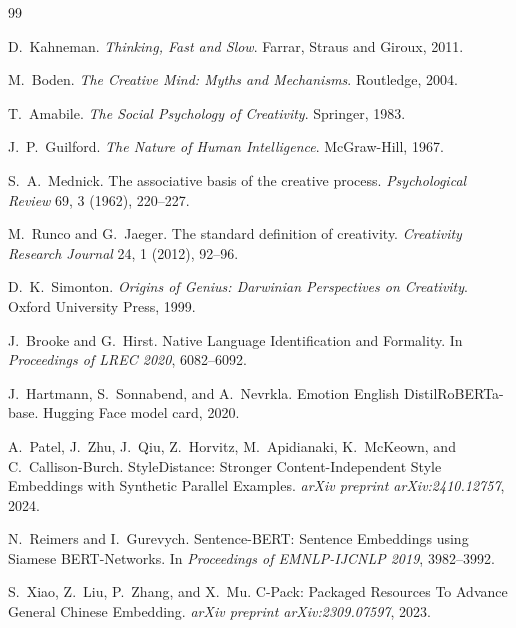 \documentclass[sigconf,nonacm]{acmart}
\begin{document}
\appendix


\begin{thebibliography}{99}

D.~Kahneman.
\newblock \textit{Thinking, Fast and Slow}.
\newblock Farrar, Straus and Giroux, 2011.

M.~Boden.
\newblock \textit{The Creative Mind: Myths and Mechanisms}.
\newblock Routledge, 2004.

T.~Amabile.
\newblock \textit{The Social Psychology of Creativity}.
\newblock Springer, 1983.

J.~P.~Guilford.
\newblock \textit{The Nature of Human Intelligence}.
\newblock McGraw-Hill, 1967.

S.~A.~Mednick.
\newblock The associative basis of the creative process.
\newblock \textit{Psychological Review} 69, 3 (1962), 220--227.

M.~Runco and G.~Jaeger.
\newblock The standard definition of creativity.
\newblock \textit{Creativity Research Journal} 24, 1 (2012), 92--96.

D.~K.~Simonton.
\newblock \textit{Origins of Genius: Darwinian Perspectives on Creativity}.
\newblock Oxford University Press, 1999.

J.~Brooke and G.~Hirst.
\newblock Native Language Identification and Formality.
\newblock In \textit{Proceedings of LREC 2020}, 6082--6092.

J.~Hartmann, S.~Sonnabend, and A.~Nevrkla.
\newblock Emotion English DistilRoBERTa-base.
\newblock Hugging Face model card, 2020.

A.~Patel, J.~Zhu, J.~Qiu, Z.~Horvitz, M.~Apidianaki, K.~McKeown, and C.~Callison-Burch.
\newblock StyleDistance: Stronger Content-Independent Style Embeddings with Synthetic Parallel Examples.
\newblock \textit{arXiv preprint arXiv:2410.12757}, 2024.

N.~Reimers and I.~Gurevych.
\newblock Sentence-BERT: Sentence Embeddings using Siamese BERT-Networks.
\newblock In \textit{Proceedings of EMNLP-IJCNLP 2019}, 3982--3992.

S.~Xiao, Z.~Liu, P.~Zhang, and X.~Mu.
\newblock C-Pack: Packaged Resources To Advance General Chinese Embedding.
\newblock \textit{arXiv preprint arXiv:2309.07597}, 2023.


\end{thebibliography}
\end{document}
